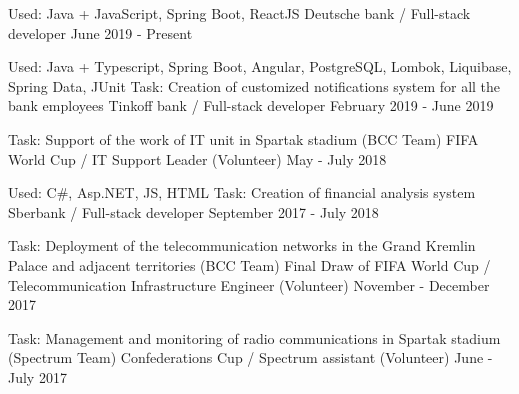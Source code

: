 

\vspace{0cm}\begin{cventries}
\cventry
{Used: Java + JavaScript, Spring Boot, ReactJS} %
{Deutsche bank / Full-stack developer} %
{} %
{June 2019 - Present} %
\noindent	
	
\cventry
{Used: Java + Typescript, Spring Boot, Angular, PostgreSQL, Lombok, Liquibase, Spring Data, JUnit
	\newline Task: Creation of customized notifications system for all the bank employees} %
{Tinkoff bank / Full-stack developer } %
{} %
{February 2019 - June 2019} %
\noindent	
	
\cventry
{Task: Support of the work of IT unit in Spartak stadium (BCC Team)} %
{FIFA World Cup / IT Support Leader (Volunteer)} %
{} %
{May - July 2018} %
\noindent	

\cventry
{Used: C\#, Asp.NET, JS, HTML
	\newline Task: Creation of financial analysis system} %
{Sberbank / Full-stack developer} %
{} %
{September 2017 - July 2018} %
\noindent	

\cventry
{Task: Deployment of the telecommunication networks in the Grand Kremlin Palace and adjacent territories (BCC Team)} %
{Final Draw of FIFA World Cup / Telecommunication Infrastructure Engineer (Volunteer)} %
{} %
{November - December 2017} %
\noindent	
	
\cventry
{Task: Management and monitoring of radio communications in Spartak stadium (Spectrum Team)} %
{Confederations Cup / Spectrum assistant (Volunteer)} %
{} %
{June - July 2017} %
\noindent	




\end{cventries}
